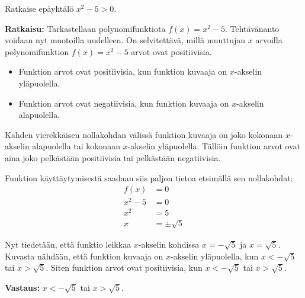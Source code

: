\begin{esimerkki}
Ratkaise epäyhtälö $x^2-5>0$.

\textbf{Ratkaisu:}
Tarkastellaan polynomifunktiota $f(x)=x^2-5$. Tehtävänanto voidaan nyt muotoilla uudelleen. On selvitettävä, millä muuttujan $x$ arvoilla polynomifunktion $f(x)=x^2-5$ arvot ovat positiivisia.

\begin{kuvaajapohja}[\kuvaajaAsetusEiRuudukkoa\kuvaajaAsetusEiLukuja]{0.6}{-5}{5}{-6}{5}
\end{kuvaajapohja}

\begin{itemize}
\item Funktion arvot ovat positiivisia, kun funktion kuvaaja on $x$-akselin yläpuolella.
\item Funktion arvot ovat negatiivisia, kun funktion kuvaaja on $x$-akselin alapuolella.
\end{itemize}

Kahden vierekkäisen nollakohdan välissä funktion kuvaaja on joko kokonaan $x$-akselin alapuolella tai kokonaan $x$-akselin yläpuolella. Tällöin funktion arvot ovat aina joko pelkästään positiivisia tai pelkästään negatiivisia.

Funktion käyttäytymisestä saadaan siis paljon tietoa etsimällä sen nollakohdat:
\begin{align*}
f(x)&=0 \\
x^2-5&=0 \\
x^2&=5 \\
x&=\pm \sqrt{5}
\end{align*}

Nyt tiedetään, että funktio leikkaa $x$-akselin kohdissa $x=-\sqrt{5}$ ja $x=\sqrt{5}$. Kuvasta nähdään, että funktion kuvaaja on $x$-akselin yläpuolella, kun $x<-\sqrt{5}$ tai $x>\sqrt{5}$. Siten funktion arvot ovat positiivisia, kun $x<-\sqrt{5}$ tai $x>\sqrt{5}$.

\begin{lukusuora}{-2.5}{2.5}{5}
\end{lukusuora}

\textbf{Vastaus:} $x<-\sqrt{5}$ tai $x>\sqrt{5}$.

\end{esimerkki}


